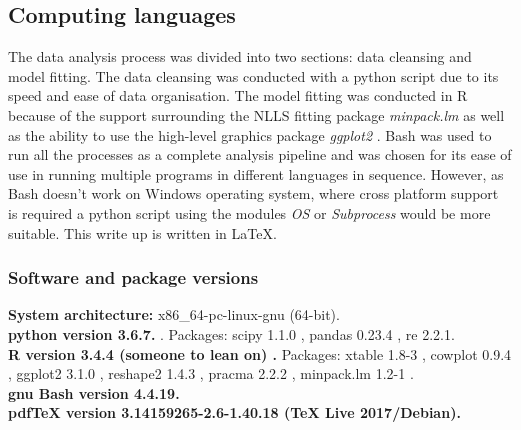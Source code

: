 \documentclass[11pt]{article}
\begin{document}
\begin{linenumbers}
\subsection{Computing languages}
The data analysis process was divided into two sections: data cleansing and model fitting. The data cleansing was conducted with a python \citep{python} script due to its speed and ease of data organisation. The model fitting was conducted in R \citep{R2018} because of the support surrounding the NLLS fitting package \textit{minpack.lm} \citep{Timur2016} as well as the ability to use the high-level graphics package \textit{ggplot2} \citep{Wickham2016}. Bash was used to run all the processes as a complete analysis pipeline and was chosen for its ease of use in running multiple programs in different languages in sequence. However, as Bash doesn't work on Windows operating system, where cross platform support is required a python script using the modules \textit{OS} or \textit{Subprocess} would be more suitable. This write up is written in \LaTeX. 

\subsubsection{Software and package versions}
\textbf{System architecture:} x86\_64-pc-linux-gnu (64-bit).\\
\textbf{python version 3.6.7.} \citep{python}. Packages: scipy 1.1.0 \citep{Jones2001}, pandas 0.23.4 \citep{Mckinney2011}, re 2.2.1.\\
\textbf{R version 3.4.4 (someone to lean on) \citep{R2018}.} Packages: xtable 1.8-3 \citep{Dahl2018}, cowplot 0.9.4 \citep{Wilke2019}, ggplot2 3.1.0 \citep{Wickham2016}, reshape2 1.4.3 \citep{Wickham2007}, pracma 2.2.2 \citep{Borchers2018}, minpack.lm 1.2-1 \citep{Timur2016}.\\
\textbf{gnu Bash version 4.4.19.}\\
\textbf{pdfTeX version 3.14159265-2.6-1.40.18 (TeX Live 2017/Debian).}

\end{linenumbers}
\end{document}
